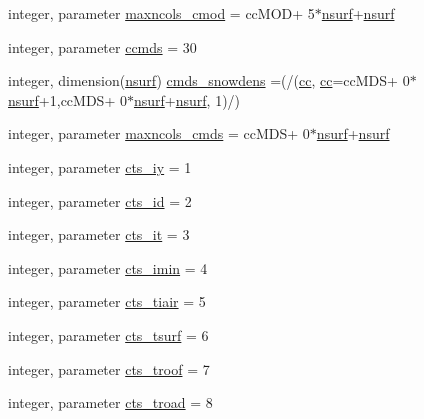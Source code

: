 \begin{DoxyCompactItemize}
\item 
integer, parameter \hyperlink{namespaceallocatearray_a1f140f40b2405f3685b595a167d59b2e}{maxncols\+\_\+cmod} = cc\+M\+OD+ 5$\ast$\hyperlink{namespaceallocatearray_acd22f92a06f7e9a2a91426b3dc99fdb0}{nsurf}+\hyperlink{namespaceallocatearray_acd22f92a06f7e9a2a91426b3dc99fdb0}{nsurf}
\item 
integer, parameter \hyperlink{namespaceallocatearray_abfa2ffdfa390b59bfba25c0870b6da2c}{ccmds} = 30
\item 
integer, dimension(\hyperlink{namespaceallocatearray_acd22f92a06f7e9a2a91426b3dc99fdb0}{nsurf}) \hyperlink{namespaceallocatearray_a6fba2ffdba3b558c1dc85a829631f700}{cmds\+\_\+snowdens} =(/(\hyperlink{namespaceallocatearray_ac863c81704eb507dee10f5e10741e10c}{cc}, \hyperlink{namespaceallocatearray_ac863c81704eb507dee10f5e10741e10c}{cc}=cc\+M\+DS+ 0$\ast$\hyperlink{namespaceallocatearray_acd22f92a06f7e9a2a91426b3dc99fdb0}{nsurf}+1,cc\+M\+DS+ 0$\ast$\hyperlink{namespaceallocatearray_acd22f92a06f7e9a2a91426b3dc99fdb0}{nsurf}+\hyperlink{namespaceallocatearray_acd22f92a06f7e9a2a91426b3dc99fdb0}{nsurf}, 1)/)
\item 
integer, parameter \hyperlink{namespaceallocatearray_ac7c54d53f039b450b99ecd7eab5ab826}{maxncols\+\_\+cmds} = cc\+M\+DS+ 0$\ast$\hyperlink{namespaceallocatearray_acd22f92a06f7e9a2a91426b3dc99fdb0}{nsurf}+\hyperlink{namespaceallocatearray_acd22f92a06f7e9a2a91426b3dc99fdb0}{nsurf}
\item 
integer, parameter \hyperlink{namespaceallocatearray_a165cbd46d15b1be6549629fe4eb6a19b}{cts\+\_\+iy} = 1
\item 
integer, parameter \hyperlink{namespaceallocatearray_a6285a744db8c15d81b15f57a83d1f8ca}{cts\+\_\+id} = 2
\item 
integer, parameter \hyperlink{namespaceallocatearray_a4690f68ad73fabe21fba5fc6e6931f79}{cts\+\_\+it} = 3
\item 
integer, parameter \hyperlink{namespaceallocatearray_a99b48eb99410f19ee1b4a36b352375d4}{cts\+\_\+imin} = 4
\item 
integer, parameter \hyperlink{namespaceallocatearray_ae57700f7e469dcff88a8171f36d6fa99}{cts\+\_\+tiair} = 5
\item 
integer, parameter \hyperlink{namespaceallocatearray_ad02b4cda49767ea25a5e15fb67d4602a}{cts\+\_\+tsurf} = 6
\item 
integer, parameter \hyperlink{namespaceallocatearray_afddbb695f2997c5edb8390f3caa3b9fa}{cts\+\_\+troof} = 7
\item 
integer, parameter \hyperlink{namespaceallocatearray_a4cbae097c6099b5e1325f2e2a2cbc440}{cts\+\_\+troad} = 8

\end{DoxyCompactItemize}
